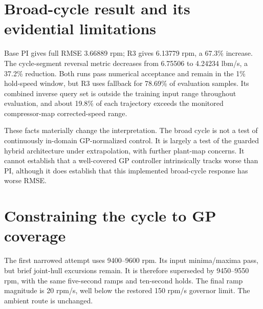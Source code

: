 
\section{Broad-cycle result and its evidential limitations}

Base PI gives full RMSE 3.66889 rpm; R3 gives 6.13779 rpm, a 67.3\% increase. The cycle-segment reversal metric decreases from 6.75506 to 4.24234 lbm/s, a 37.2\% reduction. Both runs pass numerical acceptance and remain in the 1\% hold-speed window, but R3 uses fallback for 78.69\% of evaluation samples. Its combined inverse query set is outside the training input range throughout evaluation, and about 19.8\% of each trajectory exceeds the monitored compressor-map corrected-speed range.

These facts materially change the interpretation. The broad cycle is not a test of continuously in-domain GP-normalized control. It is largely a test of the guarded hybrid architecture under extrapolation, with further plant-map concerns. It cannot establish that a well-covered GP controller intrinsically tracks worse than PI, although it does establish that this implemented broad-cycle response has worse RMSE.


\section{Constraining the cycle to GP coverage}
The first narrowed attempt uses 9400--9600 rpm. Its input minima/maxima pass, but brief joint-hull excursions remain. It is therefore superseded by 9450--9550 rpm, with the same five-second ramps and ten-second holds. The final ramp magnitude is 20 rpm/s, well below the restored 150 rpm/s governor limit. The ambient route is unchanged.

